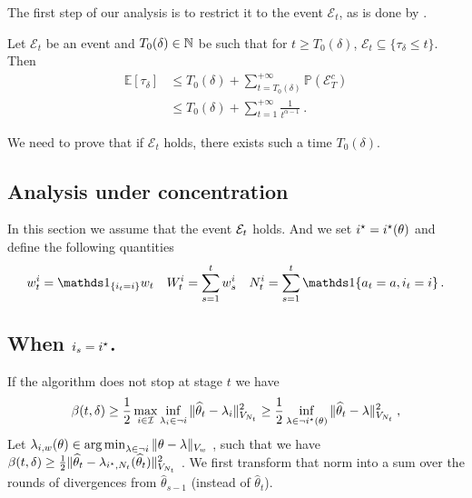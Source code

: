 The first step of our analysis is to restrict it to the event $\mathcal E_t$, as is done by \citet{garivier2016tracknstop,degenne2019game}.
\begin{lemma}
Let $\mathcal E_t$ be an event and $T_0(\delta) \in {\mathbb N}$ be such that for $t\ge T_0(\delta)$, $\mathcal E_t \subseteq \{\tau_\delta \le t\}$. Then
\begin{align*}
\mathbb{E}[\tau_\delta]
&\le T_0(\delta) + \sum_{t=T_0(\delta)}^{+\infty} \mathbb{P}(\mathcal E_T^c)
\\
&\le T_0(\delta) + \sum_{t=1}^{+\infty} \frac{1}{t^{\alpha-1}}\: .
\end{align*}
\end{lemma}

We need to prove that if $\mathcal E_t$ holds, there exists such a time $T_0(\delta)$.

\subsection{Analysis under concentration}
In this section we assume that the event $\mathcal{E}_t$ holds. And we set $i^\star=i^\star(\theta)$ and define the following quantities
\[
w_t^i = \ind_{\{i_t = i\}}w_t \quad W_t^i = \sum_{s=1}^t w_s^i\quad N_t^i = \sum_{s=1}^t \ind{\{a_t=a,i_t=i\}}\,.
\]

\subsection{When $i_s = i^\star$.}
If the algorithm does not stop at stage $t$
we have
\begin{align*}
\beta(t,\delta)
\ge \frac{1}{2}\max_{i\in\mathcal{I}} \inf_{\lambda_i \in \neg i}\Vert \widehat{\theta}_t - \lambda_i \Vert_{V_{N_t}}^2
\geq  \frac{1}{2} \inf_{\lambda \in \neg i^\star(\theta)}\Vert \widehat{\theta}_t - \lambda \Vert_{V_{N_t}}^2
\: ,
\end{align*}
Let $\lambda_{i,w}(\theta) \in \operatorname*{arg\,min}_{\lambda \in \neg i} \Vert \theta - \lambda \Vert_{V_{w}}$ , such that we have $\beta(t,\delta) \ge \frac{1}{2}\Vert \widehat{\theta}_t - \lambda_{i^\star,N_t}(\widehat{\theta}_t) \Vert_{V_{N_t}}^2$ . We first transform that norm into a sum over the rounds of divergences from $\hat{\theta}_{s-1}$ (instead of $\hat{\theta}_t$).

